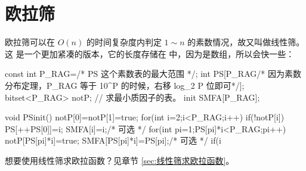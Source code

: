 \section{欧拉筛} \label{sec:欧拉筛}
欧拉筛可以在 $O(n)$ 的时间复杂度内判定 $1 \sim n$ 的素数情况，故又叫做线性筛。这
是一个更加紧凑的版本，它的长度存储在  中，因为是数组，所以会快一些：
\begin{Cpp}
const int P_RAG=/* PS 这个素数表的最大范围 */;
int PS[P_RAG/* 因为素数分布定理，P_RAG 等于 10^P 的时候，右移 log_2 P 位即可*/];
bitset<P_RAG> notP;
// 求最小质因子的表。
init SMFA[P_RAG];

void PSinit() {
  notP[0]=notP[1]=true;
  for(int i=2;i<P_RAG;i++){
    if(!notP[i]){
      PS[++PS[0]]=i;
      SMFA[i]=i;/* 可选 */
    }
    for(int pi=1;PS[pi]*i<P_RAG;pi++){
      notP[PS[pi]*i]=true;
      SMFA[PS[pi]*i]=PS[pi];/* 可选 */
      if(i%
    }
  }
}
\end{Cpp}

想要使用线性筛求欧拉函数？见章节 \ref{sec:线性筛求欧拉函数}。



